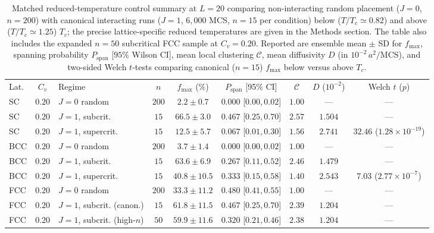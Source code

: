 \documentclass[aps,pre,reprint,superscriptaddress,amsmath,amssymb,floatfix]{revtex4-2}
\begin{document}
\begin{table}[t]
\caption{\label{tab:thermo_controls}Matched reduced-temperature control summary at $L = 20$ comparing non-interacting random placement ($J = 0$, $n = 200$) with canonical interacting runs ($J = 1$, $6{,}000$ MCS, $n = 15$ per condition) below ($T/T_c \simeq 0.82$) and above ($T/T_c \simeq 1.25$) $T_c$; the precise lattice-specific reduced temperatures are given in the Methods section. The table also includes the expanded $n = 50$ subcritical FCC sample at $C_v = 0.20$. Reported are ensemble mean $\pm$ SD for $f_{\max}$, spanning probability $P_{\mathrm{span}}$ [$95\%$ Wilson CI], mean local clustering $\mathcal{C}$, mean diffusivity $D$ (in $10^{-2}\,a^2/\mathrm{MCS}$), and two-sided Welch $t$-tests comparing canonical ($n = 15$) $f_{\max}$ below versus above $T_c$.}
\begingroup
\footnotesize
\setlength{\tabcolsep}{4pt}
\begin{ruledtabular}
\begin{tabular}{lclcccccc}
Lat. & $C_v$ & Regime & $n$ & $f_{\max}$ (\%) & $P_{\mathrm{span}}$ [95\% CI] & $\mathcal{C}$ & $D$ ($10^{-2}$) & Welch $t$ ($p$) \\
\colrule
SC  & $0.20$ & $J=0$ random         & $200$ & $2.2 \pm 0.7$   & $0.000$ [$0.00,0.02$] & $1.00$ & ---     & --- \\
SC  & $0.20$ & $J=1$, subcrit. & $15$  & $66.5 \pm 3.0$  & $0.467$ [$0.25,0.70$] & $2.57$ & $1.504$ & --- \\
SC  & $0.20$ & $J=1$, supercrit. & $15$  & $12.5 \pm 5.7$  & $0.067$ [$0.01,0.30$] & $1.56$ & $2.741$ & $32.46$ ($1.28 \times 10^{-19}$) \\
\colrule
BCC & $0.20$ & $J=0$ random         & $200$ & $3.7 \pm 1.4$   & $0.000$ [$0.00,0.02$] & $1.00$ & ---     & --- \\
BCC & $0.20$ & $J=1$, subcrit. & $15$  & $63.6 \pm 6.9$  & $0.267$ [$0.11,0.52$] & $2.46$ & $1.479$ & --- \\
BCC & $0.20$ & $J=1$, supercrit. & $15$  & $40.8 \pm 10.5$ & $0.333$ [$0.15,0.58$] & $1.40$ & $2.543$ & $7.03$ ($2.77 \times 10^{-7}$) \\
\colrule
FCC & $0.20$ & $J=0$ random         & $200$ & $33.3 \pm 11.2$ & $0.480$ [$0.41,0.55$] & $1.00$ & ---     & --- \\
FCC & $0.20$ & $J=1$, subcrit. (canon.) & $15$ & $61.8 \pm 11.5$ & $0.467$ [$0.25,0.70$] & $2.39$ & $1.204$ & --- \\
FCC & $0.20$ & $J=1$, subcrit. (high-$n$) & $50$ & $59.9 \pm 11.6$ & $0.320$ [$0.21,0.46$] & $2.38$ & $1.204$ & --- \\

\end{tabular}
\end{ruledtabular}
\end{table}
\end{document}
